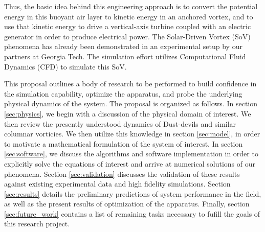 Thus, the basic idea behind this engineering approach is to convert the 
potential energy in this buoyant air layer to kinetic energy in an
anchored vortex, and to use that kinetic energy to drive a
vertical-axis turbine coupled with an electric generator in order to
produce electrical power. 
The Solar-Driven Vortex (SoV) phenomena has already been demonstrated in
an experimental setup by our partners at Georgia Tech. The simulation
effort utilizes Computational Fluid Dynamics (CFD) to simulate
this SoV. 


%
%


This proposal outlines a body of research to be performed to build
confidence in the simulation capability, optimize the apparatus, and 
probe the underlying physical dynamics of the system. 
The proposal is organized as follows. In section \ref{sec:physics}, we
begin with a discussion of the physical domain of interest. We then
review the presently understood dynamics of Dust-devils and similar
columnar vorticies. We then utilize this knowledge in section
\ref{sec:model}, in order to motivate a mathematical formulation of the
system of interest. In section \ref{sec:software}, we discuss the 
algorithms and software implementation in order to explicitly solve the
equations of interest and arrive at numerical solutions of our
phenomena. Section \ref{sec:validation} discusses the validation of
these results against existing experimental data and high fidelity
simulations.  Section \ref{sec:results} details the preliminary
predictions of system performance in the field, as well as the
present results of optimization of the apparatus. Finally, section
\ref{sec:future_work} contains a list of remaining tasks necessary to
fufill the goals of this research project. 




